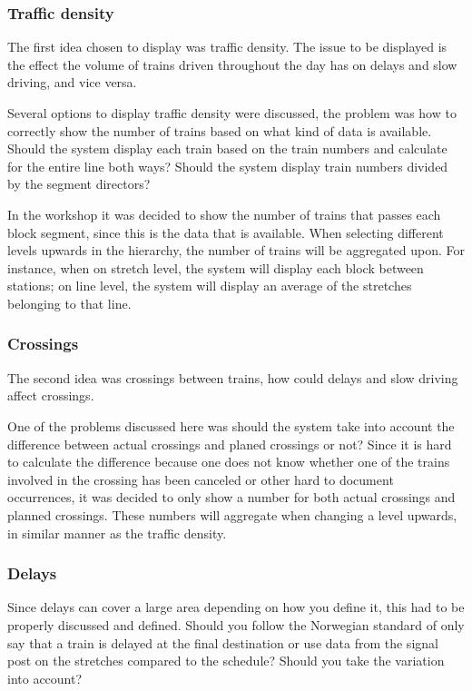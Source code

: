 \subsubsection{Traffic density} %
\label{ssub:traffic_density}
The first idea chosen to display was traffic density. The issue to be displayed
is the effect the volume of trains driven throughout the day has on delays and
slow driving, and vice versa.

Several options to display traffic density were discussed, the problem was how
to correctly show the number of trains based on what kind of data is 
available. Should the system display each train based on the train numbers and 
calculate for the entire line both ways? Should the system display train numbers divided by the segment directors? 

In the workshop it was decided to show the number of trains that passes each block segment, since this is the data that is available. When selecting different levels upwards in the hierarchy, the number of trains will be aggregated upon. For instance, when on stretch level, the system will display each block between stations; on line level, the system will display an average of the stretches belonging to that line.


\subsubsection{Crossings} %
\label{ssub:crossings}
The second idea was crossings between trains, how could delays and slow 
driving affect crossings. 

One of the problems discussed here was should the system take into account the difference
between actual crossings and planed crossings or not? Since it is hard to
calculate the difference because one does not know whether one of the trains
involved in the crossing has been canceled or other hard to document
occurrences, it was decided to only show a number for both actual crossings 
and planned crossings. These numbers will aggregate when changing a level 
upwards, in similar manner as the traffic density. 

\subsubsection{Delays} %
\label{ssub:delays}
Since delays can cover a large area depending on how you define it, this had to
be properly discussed and defined. Should you follow the Norwegian standard
\cite{jernbaneverketPunklighetsTall} of only say that a train is delayed at the
final destination or use data from the signal post on the stretches compared to
the schedule? Should you take the variation into account?

